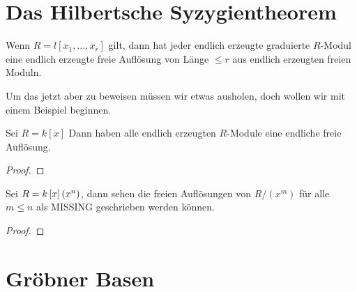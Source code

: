 \documentclass{article}
\begin{document}
\section{Das Hilbertsche Syzygientheorem}
	\begin{thm}
		Wenn 
		\( R = l \left[ x_1,\dots,x_r \right] \)
		gilt,
		dann hat jeder endlich erzeugte graduierte 
		\(R \)-Modul 
		eine endlich erzeugte freie Aufl\"osung von L\"ange 
		\( \le r \) 
		aus endlich erzeugten freien Moduln.
	\end{thm}
	Um das jetzt aber zu beweisen m\"ussen wir etwas ausholen, 
	doch wollen wir mit einem Beispiel beginnen.
	\begin{bsp}[\nocite{Eis1}{Exercise 1.22}]
		Sei 
		\( R = k\left[ x \right] \)
		Dann haben alle endlich erzeugten 
		\(R\)-Module 
		eine endliche freie Aufl\"osung.
		\begin{proof}
		
		\end{proof}
	\end{bsp}	
	\begin{thm}
	\end{thm}
	\begin{bsp}
		Sei 
		\( R= k\left[ x \right] \/ \left( x^{n} \right) \),
		dann sehen die freien Aufl\"osungen von 
		\( R\big/ \left( x^{m} \right) \) 
		f\"ur alle 
		\( m \le n \)
		als 
		{\color{red}MISSING}
		geschrieben werden k\"onnen.
		\begin{proof}

		\end{proof}
	\end{bsp}

\section{Gr\"obner Basen}
	

\end{document}
